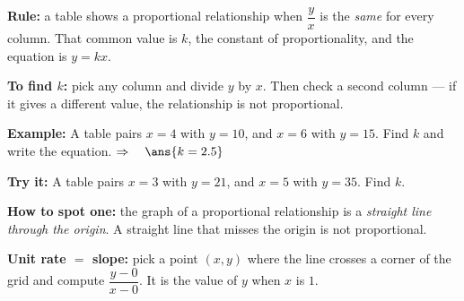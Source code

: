 \documentclass[12pt]{article}
\begin{document}


\begin{formulabox}
\textbf{Rule:} a table shows a proportional relationship when $\dfrac{y}{x}$ is the
\emph{same} for every column. That common value is $k$, the constant of
proportionality, and the equation is $y = kx$.\par
\textbf{To find $k$:} pick any column and divide $y$ by $x$. Then check a second
column --- if it gives a different value, the relationship is not proportional.
\end{formulabox}

\begin{examplebox}
\textbf{Example:} A table pairs $x = 4$ with $y = 10$, and $x = 6$ with $y = 15$.
Find $k$ and write the equation.
$\Rightarrow\quad \ans{k = 2.5}$
\end{examplebox}

\begin{tryitbox}
\textbf{Try it:} A table pairs $x = 3$ with $y = 21$, and $x = 5$ with $y = 35$.
Find $k$.\\[2pt]
\end{tryitbox}


\begin{formulabox}
\textbf{How to spot one:} the graph of a proportional relationship is a
\emph{straight line through the origin}. A straight line that misses the origin is
not proportional.\par
\textbf{Unit rate $=$ slope:} pick a point $(x,y)$ where the line crosses a corner of
the grid and compute $\dfrac{y - 0}{x - 0}$. It is the value of $y$ when $x$ is $1$.
\end{formulabox}
\end{document}
